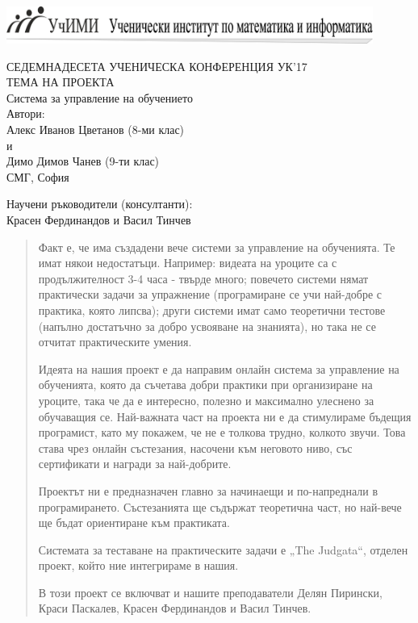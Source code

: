 \documentclass[28pt]{article}
\title{}
\author{}
\begin{document}
 
\includegraphics[width=0.9\textwidth]{logo} \\

\begin{center}
		СЕДЕМНАДЕСЕТА УЧЕНИЧЕСКА КОНФЕРЕНЦИЯ УК’17 \\ \vspace{3cm}
		ТЕМА НА ПРОЕКТА\\
		\large{Система за управление на обучението}\\ \vspace{3cm}
		Автори:\\
		Алекс Иванов Цветанов (8-ми клас) \\ и \\ Димо Димов Чанев (9-ти клас)\\
		СМГ, София\\ \vspace{3cm}

		Научени ръководители (консултанти): \\
		Красен Фердинандов и Васил Тинчев
\end{center}

\newpage
\tableofcontents
\newpage
\begin{abstract}
	\large{
  	Факт е, че има създадени вече системи за управление на обученията. Те имат някои недостатъци. Например: видеата на уроците са с продължителност 3-4 часа - твърде много; повечето системи нямат практически задачи за упражнение (програмиране се учи най-добре с практика, която липсва); други системи имат само теоретични тестове (напълно достатъчно за добро усвояване на знанията), но така не се отчитат практическите умения.
	
	Идеята на нашия проект е да направим онлайн система за управление на обученията, която да съчетава добри практики при организиране на уроците, така че да е интересно, полезно и максимално улеснено за обучаващия се. Най-важната част на проекта ни е да стимулираме бъдещия програмист, като му покажем, че не е толкова трудно, колкото звучи. Това става чрез онлайн състезания, насочени към неговото ниво, със сертификати и награди за най-добрите.
	
	Проектът ни е предназначен главно за начинаещи и по-напреднали в програмирането. Състезанията ще съдържат теоретична част, но най-вече ще бъдат ориентиране към практиката.
	
	Системата за теставане на практическите задачи е „\foreignlanguage{english}{The Judgata}“, отделен проект, който ние интегрираме в нашия.
	
	В този проект се включват и нашите преподаватели Делян Пирински, Краси Паскалев, Красен Фердинандов и Васил Тинчев.
}
\end{abstract}
\newpage
\end{document}
